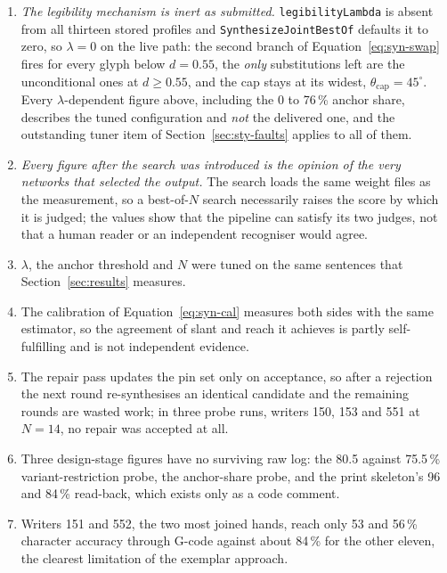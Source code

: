 \begin{enumerate}\setlength{\itemsep}{0pt}\setlength{\parskip}{0pt}
\item \emph{The legibility mechanism is inert as submitted.} \texttt{legibilityLambda} is absent from all thirteen stored profiles and \texttt{SynthesizeJointBestOf} defaults it to zero, so $\lambda=0$ on the live path: the second branch of Equation~\ref{eq:syn-swap} fires for every glyph below $d=0.55$, the \emph{only} substitutions left are the unconditional ones at $d\ge0.55$, and the cap stays at its widest, $\theta_{\mathrm{cap}}=45^\circ$. Every $\lambda$-dependent figure above, including the 0 to 76\,\% anchor share, describes the tuned configuration and \emph{not} the delivered one, and the outstanding tuner item of Section~\ref{sec:sty-faults} applies to all of them.
\item \emph{Every figure after the search was introduced is the opinion of the very networks that selected the output.} The search loads the same weight files as the measurement, so a best-of-$N$ search necessarily raises the score by which it is judged; the values show that the pipeline can satisfy its two judges, not that a human reader or an independent recogniser would agree.
\item $\lambda$, the anchor threshold and $N$ were tuned on the same sentences that Section~\ref{sec:results} measures.
\item The calibration of Equation~\ref{eq:syn-cal} measures both sides with the same estimator, so the agreement of slant and reach it achieves is partly self-fulfilling and is not independent evidence.
\item The repair pass updates the pin set only on acceptance, so after a rejection the next round re-synthesises an identical candidate and the remaining rounds are wasted work; in three probe runs, writers 150, 153 and 551 at $N=14$, no repair was accepted at all.
\item Three design-stage figures have no surviving raw log: the 80.5 against 75.5\,\% variant-restriction probe, the anchor-share probe, and the print skeleton's 96 and 84\,\% read-back, which exists only as a code comment.
\item Writers 151 and 552, the two most joined hands, reach only 53 and 56\,\% character accuracy through G-code against about 84\,\% for the other eleven, the clearest limitation of the exemplar approach.
\end{enumerate}
